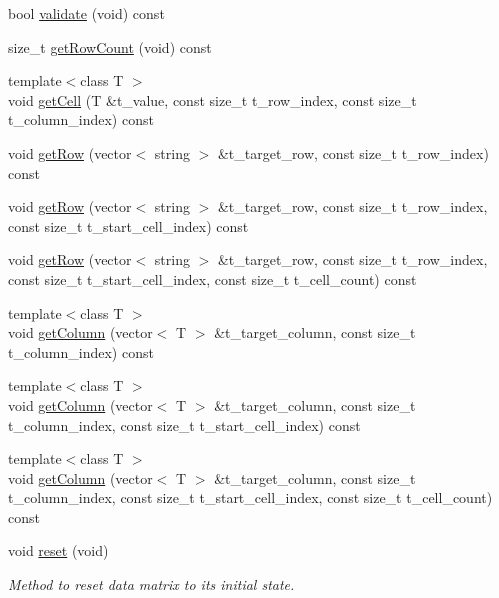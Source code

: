 \begin{DoxyCompactItemize}
\item 
bool \hyperlink{classutils_1_1SlightMatrix_a536e733a179ee3eaeb5c75986cc477d3}{validate} (void) const
\item 
size\+\_\+t \hyperlink{classutils_1_1SlightMatrix_af171e463492b423251369cd7b8799a97}{get\+Row\+Count} (void) const
\item 
{\footnotesize template$<$class T $>$ }\\void \hyperlink{classutils_1_1SlightMatrix_a38fb4bf075982a520ebc400296c737b8}{get\+Cell} (T \&t\+\_\+value, const size\+\_\+t t\+\_\+row\+\_\+index, const size\+\_\+t t\+\_\+column\+\_\+index) const
\item 
void \hyperlink{classutils_1_1SlightMatrix_a7368ae91d7ba0607273ad008bec653e3}{get\+Row} (vector$<$ string $>$ \&t\+\_\+target\+\_\+row, const size\+\_\+t t\+\_\+row\+\_\+index) const
\item 
void \hyperlink{classutils_1_1SlightMatrix_aa5c46b5638563789f5a7bbea90782ffc}{get\+Row} (vector$<$ string $>$ \&t\+\_\+target\+\_\+row, const size\+\_\+t t\+\_\+row\+\_\+index, const size\+\_\+t t\+\_\+start\+\_\+cell\+\_\+index) const
\item 
void \hyperlink{classutils_1_1SlightMatrix_a730e8d6d9762491a8c5189ae6bd04ca7}{get\+Row} (vector$<$ string $>$ \&t\+\_\+target\+\_\+row, const size\+\_\+t t\+\_\+row\+\_\+index, const size\+\_\+t t\+\_\+start\+\_\+cell\+\_\+index, const size\+\_\+t t\+\_\+cell\+\_\+count) const
\item 
{\footnotesize template$<$class T $>$ }\\void \hyperlink{classutils_1_1SlightMatrix_a21c334bd89d48d122a34fc1122c5fc5a}{get\+Column} (vector$<$ T $>$ \&t\+\_\+target\+\_\+column, const size\+\_\+t t\+\_\+column\+\_\+index) const
\item 
{\footnotesize template$<$class T $>$ }\\void \hyperlink{classutils_1_1SlightMatrix_a6d00c191a13e4a2b2d018b79acfb7235}{get\+Column} (vector$<$ T $>$ \&t\+\_\+target\+\_\+column, const size\+\_\+t t\+\_\+column\+\_\+index, const size\+\_\+t t\+\_\+start\+\_\+cell\+\_\+index) const
\item 
{\footnotesize template$<$class T $>$ }\\void \hyperlink{classutils_1_1SlightMatrix_ac6da4f6f4531dd68680ec586c2609273}{get\+Column} (vector$<$ T $>$ \&t\+\_\+target\+\_\+column, const size\+\_\+t t\+\_\+column\+\_\+index, const size\+\_\+t t\+\_\+start\+\_\+cell\+\_\+index, const size\+\_\+t t\+\_\+cell\+\_\+count) const
\item 
\mbox{\label{classutils_1_1SlightMatrix_a9fa5e54d8c43cc967596f708a37aab50}} 
void \hyperlink{classutils_1_1SlightMatrix_a9fa5e54d8c43cc967596f708a37aab50}{reset} (void)
\begin{DoxyCompactList}\small\item\em Method to reset data matrix to its initial state. \end{DoxyCompactList}\end{DoxyCompactItemize}


